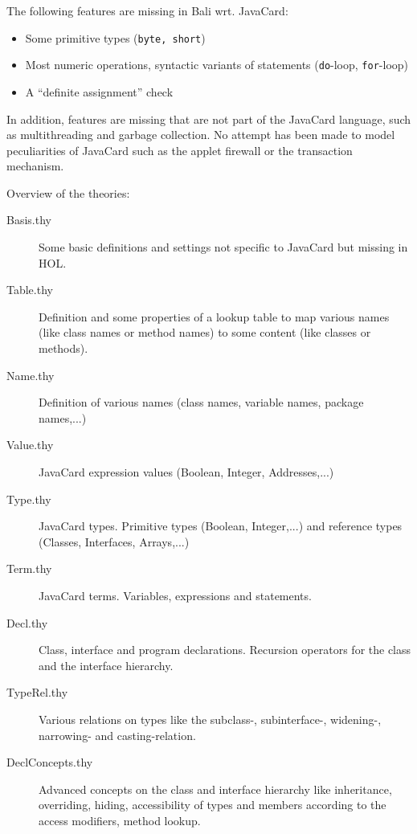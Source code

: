 \documentclass[11pt,a4paper]{book}
\begin{document}
The following features are missing in Bali wrt.{} JavaCard:
\begin{itemize}
\item Some primitive types (\texttt{byte, short})
\item Most numeric operations, syntactic variants of statements
  (\texttt{do}-loop, \texttt{for}-loop)
\item A ``definite assignment'' check
\end{itemize}

In addition, features are missing that are not part of the JavaCard
language, such as multithreading and garbage collection. No attempt
has been made to model peculiarities of JavaCard such as the applet
firewall or the transaction mechanism.


Overview of the theories:
\begin{description}
\item [Basis.thy] 
Some basic definitions and settings not specific to JavaCard but missing in HOL.

\item [Table.thy]
Definition and some properties of a lookup table to map various names 
(like class names or method names) to some content (like classes or methods).

\item[Name.thy]
Definition of various names (class names, variable names, package names,...)

\item[Value.thy]
JavaCard expression values (Boolean, Integer, Addresses,...)

\item[Type.thy]
JavaCard types. Primitive types (Boolean, Integer,...) and reference types 
(Classes, Interfaces, Arrays,...)

\item[Term.thy]
JavaCard terms. Variables, expressions and statements.

\item[Decl.thy]
Class, interface and program declarations. Recursion operators for the
class and the interface hierarchy. 

\item[TypeRel.thy]
Various relations on types like the subclass-, subinterface-, widening-, 
narrowing- and casting-relation.

\item[DeclConcepts.thy]
Advanced concepts on the class and interface hierarchy like inheritance, 
overriding, hiding, accessibility of types and members according to the access 
modifiers, method lookup.


\end{description}
\end{document}
